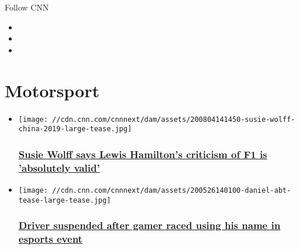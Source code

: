 Follow CNN

\begin{itemize}
\item
\item
\item
\end{itemize}

\hypertarget{motorsport}{%
\section{Motorsport}\label{motorsport}}

\begin{itemize}
\item
  \href{/2020/08/04/sport/susie-wolff-formula-e-return-spt-intl-cmd/index.html}{}

  \texttt{[image: //cdn.cnn.com/cnnnext/dam/assets/200804141450-susie-wolff-china-2019-large-tease.jpg]}

  \hypertarget{susie-wolff-says-lewis-hamiltons-criticism-of-f1-is-absolutely-valid}{%
  \subsubsection{\texorpdfstring{\href{/2020/08/04/sport/susie-wolff-formula-e-return-spt-intl-cmd/index.html}{Susie
  Wolff says Lewis Hamilton's criticism of F1 is 'absolutely
  valid'}}{Susie Wolff says Lewis Hamilton's criticism of F1 is 'absolutely valid'}}\label{susie-wolff-says-lewis-hamiltons-criticism-of-f1-is-absolutely-valid}}
\end{itemize}

\begin{itemize}
\item
  \href{/2020/05/26/motorsport/daniel-abt-formula-e-suspended-audi-esports-spt-intl/index.html}{}

  \texttt{[image: //cdn.cnn.com/cnnnext/dam/assets/200526140100-daniel-abt-tease-large-tease.jpg]}

  \hypertarget{driver-suspended-after-gamer-raced-using-his-name-in-esports-event}{%
  \subsubsection{\texorpdfstring{\href{/2020/05/26/motorsport/daniel-abt-formula-e-suspended-audi-esports-spt-intl/index.html}{Driver
  suspended after gamer raced using his name in esports
  event}}{Driver suspended after gamer raced using his name in esports event}}\label{driver-suspended-after-gamer-raced-using-his-name-in-esports-event}}
\end{itemize}

